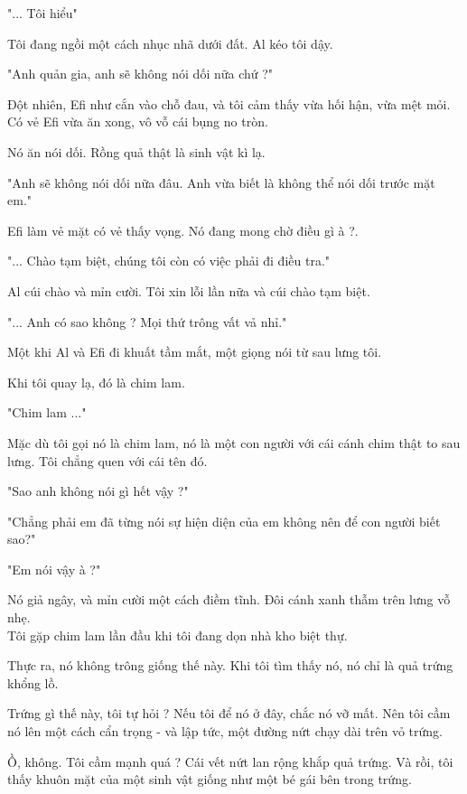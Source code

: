 "... Tôi hiểu"

Tôi đang ngồi một cách nhục nhã dưới đất. Al kéo tôi dậy.

"Anh quản gia, anh sẽ không nói dối nữa chứ ?"

Đột nhiên, Efi như cắn vào chỗ đau, và tôi cảm thấy vừa hối hận, vừa mệt mỏi. Có vẻ Efi vừa ăn xong, vô vỗ cái bụng no tròn.

Nó ăn nói dối. Rồng quả thật là sinh vật kì lạ.

"Anh sẽ không nói dối nữa đâu. Anh vừa biết là không thể nói dối trước mặt em."

Efi làm vẻ mặt có vẻ thấy vọng. Nó đang mong chờ điều gì à ?.

"... Chào tạm biệt, chúng tôi còn có việc phải đi điều tra."

Al cúi chào và mỉn cười. Tôi xin lỗi lần nữa và cúi chào tạm biệt.


"... Anh có sao không ? Mọi thứ trông vất vả nhỉ."

Một khi Al và Efi đi khuất tầm mắt, một giọng nói từ sau lưng tôi.

Khi tôi quay lạ, đó là chim lam.

"Chim lam ..."

Mặc dù tôi gọi nó là chim lam, nó là một con người với cái cánh chim thật to sau lưng. Tôi chẳng quen với cái tên đó.

"Sao anh không nói gì hết vậy ?"

"Chẳng phải em đã từng nói sự hiện diện của em không nên để con người biết sao?"

"Em nói vậy à ?"

Nó giả ngây, và mỉn cười một cách điềm tĩnh. Đôi cánh xanh thẫm trên lưng vỗ nhẹ. \\


Tôi gặp chim lam lần đầu khi tôi đang dọn nhà kho biệt thự. 

Thực ra, nó không trông giống thế này. Khi tôi tìm thấy nó, nó chỉ là quả trứng khổng lồ.

Trứng gì thế này, tôi tự hỏi ? Nếu tôi để nó ở đây, chắc nó vỡ mất. Nên tôi cầm nó lên một cách cẩn trọng - và lập tức, một đường nứt chạy dài trên vỏ trứng.

Ồ, không. Tôi cầm mạnh quá ? Cái vết nứt lan rộng khắp quả trứng. Và rồi, tôi thấy khuôn mặt của một sinh vật giống như một bé gái bên trong trứng. 

